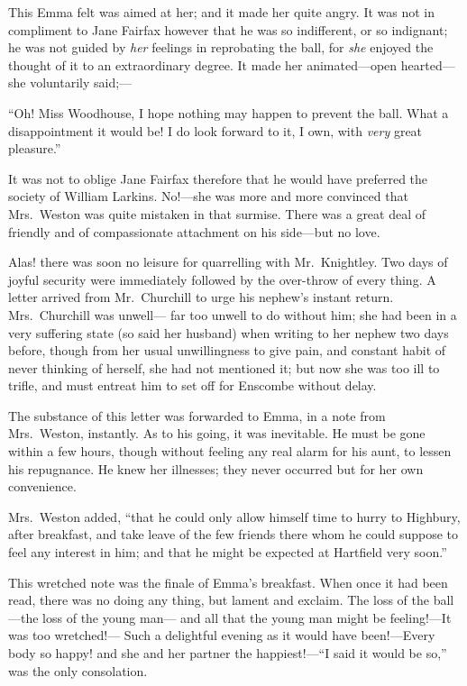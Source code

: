 This Emma felt was aimed at her; and it made her quite angry.
It was not in compliment to Jane Fairfax however that he was
so indifferent, or so indignant; he was not guided by \emph{her} feelings
in reprobating the ball, for \emph{she} enjoyed the thought of it
to an extraordinary degree.  It made her animated---open hearted---%
she voluntarily said;---%

``Oh!  Miss Woodhouse, I hope nothing may happen to prevent the ball.
What a disappointment it would be!  I do look forward to it, I own,
with \emph{very} great pleasure.''

It was not to oblige Jane Fairfax therefore that he would have
preferred the society of William Larkins.  No!---she was more and more
convinced that Mrs.\ Weston was quite mistaken in that surmise.
There was a great deal of friendly and of compassionate attachment
on his side---but no love.

Alas! there was soon no leisure for quarrelling with Mr.\ Knightley.
Two days of joyful security were immediately followed by the
over-throw of every thing.  A letter arrived from Mr.\ Churchill
to urge his nephew's instant return.  Mrs.\ Churchill was unwell---%
far too unwell to do without him; she had been in a very suffering
state (so said her husband) when writing to her nephew two days before,
though from her usual unwillingness to give pain, and constant
habit of never thinking of herself, she had not mentioned it;
but now she was too ill to trifle, and must entreat him to set off
for Enscombe without delay.

The substance of this letter was forwarded to Emma, in a note
from Mrs.\ Weston, instantly.  As to his going, it was inevitable.
He must be gone within a few hours, though without feeling any real
alarm for his aunt, to lessen his repugnance.  He knew her illnesses;
they never occurred but for her own convenience.

Mrs.\ Weston added, ``that he could only allow himself time to
hurry to Highbury, after breakfast, and take leave of the few
friends there whom he could suppose to feel any interest in him;
and that he might be expected at Hartfield very soon.''

This wretched note was the finale of Emma's breakfast.  When once
it had been read, there was no doing any thing, but lament
and exclaim.  The loss of the ball---the loss of the young man---%
and all that the young man might be feeling!---It was too wretched!---%
Such a delightful evening as it would have been!---Every body so happy!
and she and her partner the happiest!---``I said it would be so,''
was the only consolation.

